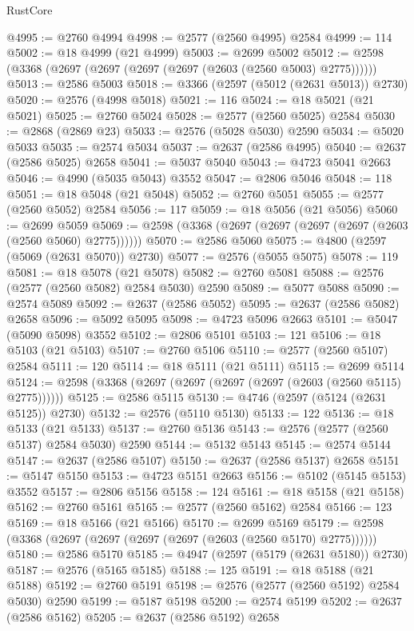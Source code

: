 \begin{lexlean}{RustCore}
\begin{coremodule}
@4995 := @2760 @4994
@4998 := @2577 (@2560 @4995) @2584
@4999 := 114
@5002 := @18 @4999 (@21 @4999)
@5003 := @2699 @5002
@5012 := @2598 (@3368 (@2697 (@2697 (@2697 (@2697 (@2603 (@2560 @5003) @2775))))))
@5013 := @2586 @5003
@5018 := @3366 (@2597 (@5012 (@2631 @5013)) @2730)
@5020 := @2576 (@4998 @5018)
@5021 := 116
@5024 := @18 @5021 (@21 @5021)
@5025 := @2760 @5024
@5028 := @2577 (@2560 @5025) @2584
@5030 := @2868 (@2869 @23)
@5033 := @2576 (@5028 @5030) @2590
@5034 := @5020 @5033
@5035 := @2574 @5034
@5037 := @2637 (@2586 @4995)
@5040 := @2637 (@2586 @5025) @2658
@5041 := @5037 @5040
@5043 := @4723 @5041 @2663
@5046 := @4990 (@5035 @5043) @3552
@5047 := @2806 @5046
@5048 := 118
@5051 := @18 @5048 (@21 @5048)
@5052 := @2760 @5051
@5055 := @2577 (@2560 @5052) @2584
@5056 := 117
@5059 := @18 @5056 (@21 @5056)
@5060 := @2699 @5059
@5069 := @2598 (@3368 (@2697 (@2697 (@2697 (@2697 (@2603 (@2560 @5060) @2775))))))
@5070 := @2586 @5060
@5075 := @4800 (@2597 (@5069 (@2631 @5070)) @2730)
@5077 := @2576 (@5055 @5075)
@5078 := 119
@5081 := @18 @5078 (@21 @5078)
@5082 := @2760 @5081
@5088 := @2576 (@2577 (@2560 @5082) @2584 @5030) @2590
@5089 := @5077 @5088
@5090 := @2574 @5089
@5092 := @2637 (@2586 @5052)
@5095 := @2637 (@2586 @5082) @2658
@5096 := @5092 @5095
@5098 := @4723 @5096 @2663
@5101 := @5047 (@5090 @5098) @3552
@5102 := @2806 @5101
@5103 := 121
@5106 := @18 @5103 (@21 @5103)
@5107 := @2760 @5106
@5110 := @2577 (@2560 @5107) @2584
@5111 := 120
@5114 := @18 @5111 (@21 @5111)
@5115 := @2699 @5114
@5124 := @2598 (@3368 (@2697 (@2697 (@2697 (@2697 (@2603 (@2560 @5115) @2775))))))
@5125 := @2586 @5115
@5130 := @4746 (@2597 (@5124 (@2631 @5125)) @2730)
@5132 := @2576 (@5110 @5130)
@5133 := 122
@5136 := @18 @5133 (@21 @5133)
@5137 := @2760 @5136
@5143 := @2576 (@2577 (@2560 @5137) @2584 @5030) @2590
@5144 := @5132 @5143
@5145 := @2574 @5144
@5147 := @2637 (@2586 @5107)
@5150 := @2637 (@2586 @5137) @2658
@5151 := @5147 @5150
@5153 := @4723 @5151 @2663
@5156 := @5102 (@5145 @5153) @3552
@5157 := @2806 @5156
@5158 := 124
@5161 := @18 @5158 (@21 @5158)
@5162 := @2760 @5161
@5165 := @2577 (@2560 @5162) @2584
@5166 := 123
@5169 := @18 @5166 (@21 @5166)
@5170 := @2699 @5169
@5179 := @2598 (@3368 (@2697 (@2697 (@2697 (@2697 (@2603 (@2560 @5170) @2775))))))
@5180 := @2586 @5170
@5185 := @4947 (@2597 (@5179 (@2631 @5180)) @2730)
@5187 := @2576 (@5165 @5185)
@5188 := 125
@5191 := @18 @5188 (@21 @5188)
@5192 := @2760 @5191
@5198 := @2576 (@2577 (@2560 @5192) @2584 @5030) @2590
@5199 := @5187 @5198
@5200 := @2574 @5199
@5202 := @2637 (@2586 @5162)
@5205 := @2637 (@2586 @5192) @2658

\end{coremodule}
\end{lexlean}
